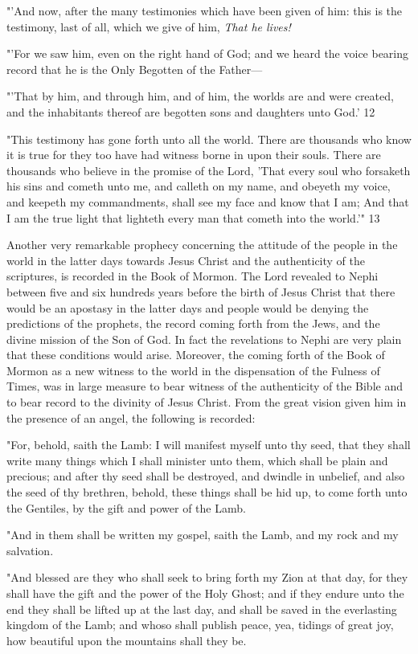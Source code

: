 "'And now, after the many testimonies which have been given of him: this is the testimony,
last of all, which we give of him, \textit{That he lives!}

"'For we saw him, even on the right hand of God; and we heard the voice bearing record that
he is the Only Begotten of the Father—

"'That by him, and through him, and of him, the worlds are and were created, and the
inhabitants thereof are begotten sons and daughters unto God.' 12

"This testimony has gone forth unto all the world. There are thousands who know it is true
for they too have had witness borne in upon their souls. There are thousands who believe in
the promise of the Lord, 'That every soul who forsaketh his sins and cometh unto me, and
calleth on my name, and obeyeth my voice, and keepeth my commandments, shall see my
face and know that I am; And that I am the true light that lighteth every man that cometh into
the world.'" 13

Another very remarkable prophecy concerning the attitude of the people in the world in the
latter days towards Jesus Christ and the authenticity of the scriptures, is recorded in the Book
of Mormon. The Lord revealed to Nephi between five and six hundreds years before the birth
of Jesus Christ that there would be an apostasy in the latter days and people would be
denying the predictions of the prophets, the record coming forth from the Jews, and the
divine mission of the Son of God. In fact the revelations to Nephi are very plain that these
conditions would arise. Moreover, the coming forth of the Book of Mormon as a new witness
to the world in the dispensation of the Fulness of Times, was in large measure to bear witness
of the authenticity of the Bible and to bear record to the divinity of Jesus Christ. From the
great vision given him in the presence of an angel, the following is recorded:

"For, behold, saith the Lamb: I will manifest myself unto thy seed, that they shall write many
things which I shall minister unto them, which shall be plain and precious; and after thy seed
shall be destroyed, and dwindle in unbelief, and also the seed of thy brethren, behold, these
things shall be hid up, to come forth unto the Gentiles, by the gift and power of the Lamb.

"And in them shall be written my gospel, saith the Lamb, and my rock and my salvation.

"And blessed are they who shall seek to bring forth my Zion at that day, for they shall have
the gift and the power of the Holy Ghost; and if they endure unto the end they shall be lifted
up at the last day, and shall be saved in the everlasting kingdom of the Lamb; and whoso
shall publish peace, yea, tidings of great joy, how beautiful upon the mountains shall they be.

